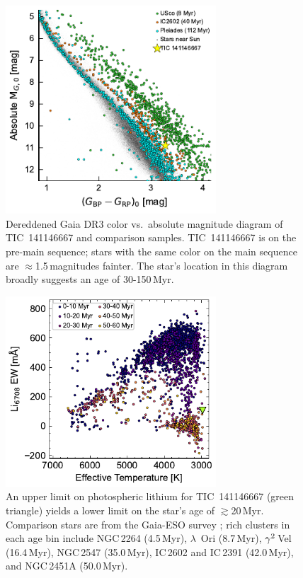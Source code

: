\documentclass{nature3}
\begin{document}
\begin{methods}
\begin{figure}[!t]
  \centering
  \includegraphics[width=0.7\textwidth]{figures/sf3.pdf}
  \caption{Dereddened Gaia DR3 color vs.~absolute magnitude diagram of
  TIC~141146667 and comparison samples. 
  TIC~141146667 is on the pre-main sequence; stars with the same color
  on the main sequence are $\approx$1.5\,magnitudes
  fainter.  The star's location in this diagram broadly suggests an
  age of 30-150\,Myr.  }
  \label{fig:camd}
\end{figure}


\begin{figure}[!t]
  \centering
  \includegraphics[width=0.7\textwidth]{figures/sf2.pdf}
  \caption{An upper limit on photospheric lithium for TIC~141146667
  (green triangle) yields a lower limit on the star's age of
  $\gtrsim$20\,Myr.  Comparison stars are from the Gaia-ESO survey
  \cite{Jeffries2023}; rich clusters in each age bin include NGC\,2264
  (4.5\,Myr), $\lambda$~Ori (8.7\,Myr), ${\rm \gamma}^2$\,Vel
  (16.4\,Myr), NGC\,2547 (35.0\,Myr), IC\,2602 and IC\,2391 (42.0\,Myr),
  and NGC\,2451A (50.0\,Myr). }
  \label{fig:liew_population}
\end{figure}



\end{methods}
\end{document}
